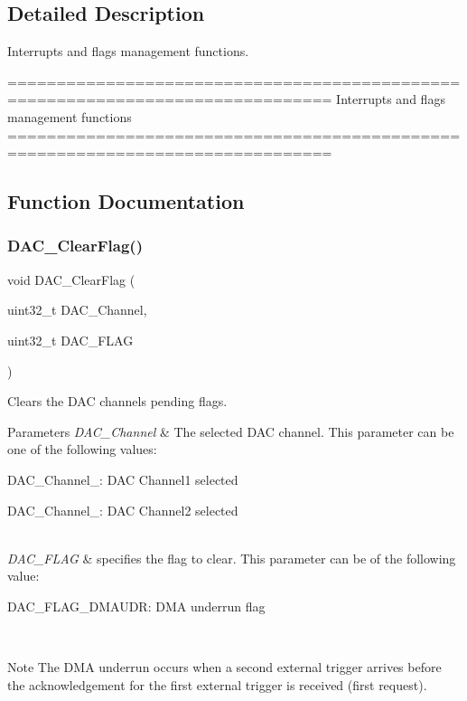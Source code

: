 \subsection{Detailed Description}
Interrupts and flags management functions. 

\begin{DoxyVerb} ===============================================================================
                   Interrupts and flags management functions
 ===============================================================================  \end{DoxyVerb}
 

\subsection{Function Documentation}
\mbox{\label{group__DAC__Group3_ga49543c52786d70d6b6311f3fee856d37}} 
\subsubsection{D\+A\+C\+\_\+\+Clear\+Flag()}
{\footnotesize\ttfamily void D\+A\+C\+\_\+\+Clear\+Flag (\begin{DoxyParamCaption}\item[{uint32\+\_\+t}]{D\+A\+C\+\_\+\+Channel,  }\item[{uint32\+\_\+t}]{D\+A\+C\+\_\+\+F\+L\+AG }\end{DoxyParamCaption})}



Clears the D\+AC channel\textquotesingle{}s pending flags. 


\begin{DoxyParams}{Parameters}
{\em D\+A\+C\+\_\+\+Channel} & The selected D\+AC channel. This parameter can be one of the following values\+: \begin{DoxyItemize}
\item D\+A\+C\+\_\+\+Channel\+\_\+: D\+AC Channel1 selected \item D\+A\+C\+\_\+\+Channel\+\_\+: D\+AC Channel2 selected \end{DoxyItemize}
\\
\hline
{\em D\+A\+C\+\_\+\+F\+L\+AG} & specifies the flag to clear. This parameter can be of the following value\+: \begin{DoxyItemize}
\item D\+A\+C\+\_\+\+F\+L\+A\+G\+\_\+\+D\+M\+A\+U\+DR\+: D\+MA underrun flag \end{DoxyItemize}
\\
\hline
\end{DoxyParams}
\begin{DoxyNote}{Note}
The D\+MA underrun occurs when a second external trigger arrives before the acknowledgement for the first external trigger is received (first request). 
\end{DoxyNote}

